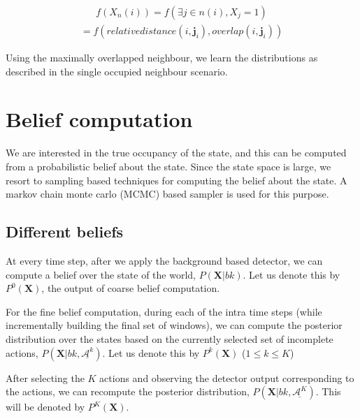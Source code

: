 \documentclass[10pt,twocolumn,letterpaper]{article}
\begin{document}
\begin{align}
f(X_n(i)) = f(\exists j \in{n(i)},X_{j} =1)
\end{align}
\begin{align}
= f(relativedistance(i,\textbf{j}_{i}),overlap(i,\textbf{j}_{i}))
\end{align}

Using the maximally overlapped neighbour, we learn the distributions as described in the single occupied neighbour scenario.


%
%
%

\section{Belief computation}
We are interested in the true occupancy of the state, and this can be computed from a probabilistic belief about the state. Since the state space is large, we resort to sampling based techniques for computing the belief about the state. A markov chain monte carlo (MCMC) based sampler is used for this purpose.

\subsection{Different beliefs}
At every time step, after we apply the background based detector, we can compute a belief over the state of the world, $P(\textbf{X}|bk)$. Let us denote this by $ P^{0}(\textbf{X})$, the output of coarse belief computation.

For the fine belief computation, during each of the intra time steps (while incrementally building the final set of windows), we can compute the posterior distribution over the states based on the currently selected set of incomplete actions, $ P(\textbf{X}|bk,\underline{\mathcal{A}^{k}} )$. Let us denote this by $ P^{k}(\textbf{X})$ ($1 \leq k \leq K $)

After selecting the $K $ actions and observing the detector output corresponding to the actions, we can recompute the posterior distribution, $P(\textbf{X}|bk, \underline{\mathcal{A}^{K}})$. This will be denoted by $P^{K}(\textbf{X})$.
\end{document}
